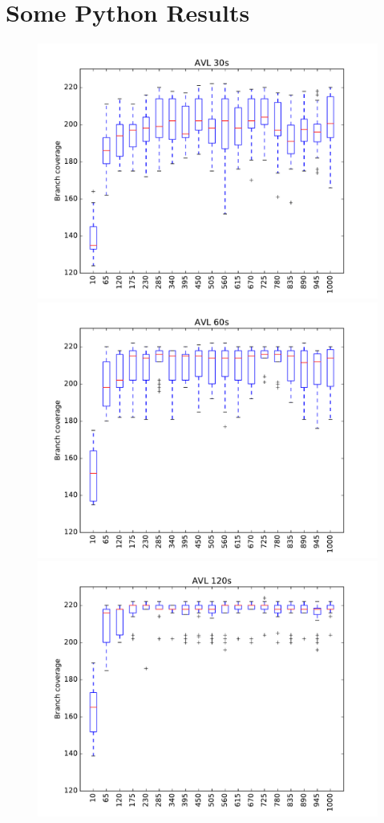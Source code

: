 \section{Some Python Results}



\begin{figure}
\includegraphics[width=\columnwidth]{graphs/AVLrand30}
\includegraphics[width=\columnwidth]{graphs/AVLrand60}
\includegraphics[width=\columnwidth]{graphs/AVLrand120}
\end{figure}

